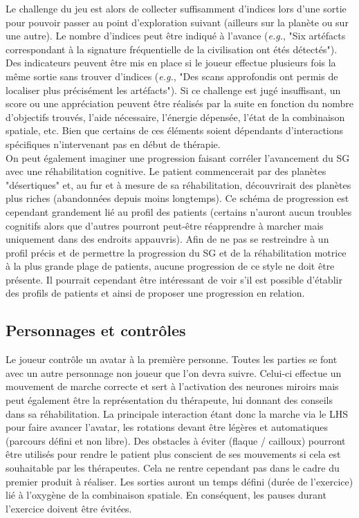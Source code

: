		Le challenge du jeu est alors de collecter suffisamment d'indices lors d'une sortie pour pouvoir passer au point d'exploration suivant (ailleurs sur la planète ou sur une autre). Le nombre d'indices peut être indiqué à l'avance (\textit{e.g.}, "Six artéfacts correspondant à la signature fréquentielle de la civilisation ont étés détectés"). Des indicateurs peuvent être mis en place si le joueur effectue plusieurs fois la même sortie sans trouver d'indices (\textit{e.g.}, "Des scans approfondis ont permis de localiser plus précisément les artéfacts"). Si ce challenge est jugé insuffisant, un score ou une appréciation peuvent être réalisés par la suite en fonction du nombre d'objectifs trouvés, l'aide nécessaire, l'énergie dépensée, l'état de la combinaison spatiale, etc. Bien que certains de ces éléments soient dépendants d'interactions spécifiques n'intervenant pas en début de thérapie.	
		\\
		
		On peut également imaginer une progression faisant corréler l'avancement du SG avec une réhabilitation cognitive. Le patient commencerait par des planètes "désertiques" et, au fur et à mesure de sa réhabilitation, découvrirait des planètes plus riches (abandonnées depuis moins longtemps). Ce schéma de progression est cependant grandement lié au profil des patients (certains n'auront aucun troubles cognitifs alors que d'autres pourront peut-être réapprendre à marcher mais uniquement dans des endroits appauvris). Afin de ne pas se restreindre à un profil précis et de permettre la progression du SG et de la réhabilitation motrice à la plus grande plage de patients, aucune progression de ce style ne doit être présente. Il pourrait cependant être intéressant de voir s'il est possible d'établir des profils de patients et ainsi de proposer une progression en relation.
		
	\subsection*{Personnages et contrôles}
		Le joueur contrôle un avatar à la première personne. Toutes les parties se font avec un autre personnage non joueur que l'on devra suivre. Celui-ci effectue un mouvement de marche correcte et sert à l'activation des neurones miroirs mais peut également être la représentation du thérapeute, lui donnant des conseils dans sa réhabilitation. La principale interaction étant donc la marche via le LHS pour faire avancer l'avatar, les rotations devant être légères et automatiques (parcours défini et non libre). Des obstacles à éviter (flaque / cailloux) pourront être utilisés pour rendre le patient plus conscient de ses mouvements si cela est souhaitable par les thérapeutes. Cela ne rentre cependant pas dans le cadre du premier produit à réaliser. Les sorties auront un temps défini (durée de l'exercice) lié à l'oxygène de la combinaison spatiale. En conséquent, les pauses durant l'exercice doivent être évitées.
		
